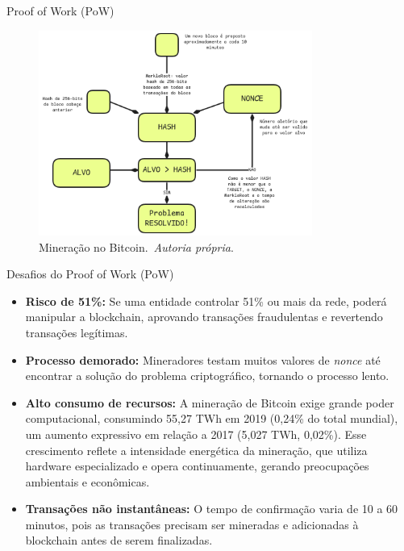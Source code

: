 \begin{frame}{Proof of Work (PoW)}

	\begin{figure}
		\centering
		\includegraphics[width=0.8\textwidth]{figures/bitcoinmining.png}
		\caption{Mineração no Bitcoin.\ \textit{Autoria própria}.}
		\label{fig:bitcoinmining}
	\end{figure}

\end{frame}

\begin{frame}{Desafios do Proof of Work (PoW)}

	\begin{itemize}
		\item \textbf{Risco de 51\%:} Se uma entidade controlar 51\% ou mais da
		      rede, poderá manipular a blockchain, aprovando transações fraudulentas e
		      revertendo transações legítimas.
		\item \textbf{Processo demorado:} Mineradores testam muitos valores de
		      \textit{nonce} até encontrar a solução do problema criptográfico, tornando
		      o processo lento.
		\item \textbf{Alto consumo de recursos:} A mineração de Bitcoin exige grande
		      poder computacional, consumindo 55,27 TWh em 2019 (0,24\% do total mundial),
		      um aumento expressivo em relação a 2017 (5,027 TWh, 0,02\%). Esse
		      crescimento reflete a intensidade energética da mineração, que utiliza
		      hardware especializado e opera continuamente, gerando preocupações
		      ambientais e econômicas.~\cite{kufeoglu2019energy}
		\item \textbf{Transações não instantâneas:} O tempo de confirmação varia de
		      10 a 60 minutos, pois as transações precisam ser mineradas e adicionadas à
		      blockchain antes de serem finalizadas.
	\end{itemize}

\end{frame}
